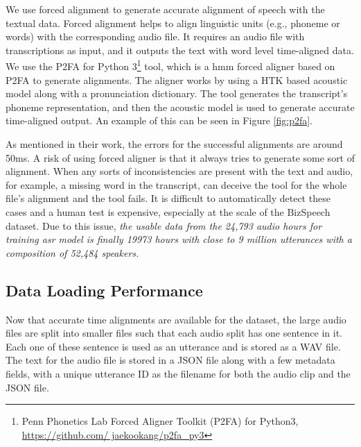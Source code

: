 We use forced alignment to generate accurate alignment of speech with the textual data. Forced alignment helps to align linguistic units (e.g., phoneme or words) with the corresponding audio file. It requires an audio file with transcriptions as input, and it outputs the text with word level time-aligned data. We use the P2FA for Python 3\footnote{Penn Phonetics Lab Forced Aligner Toolkit (P2FA) for Python3, \href{https://github.com/jaekookang/p2fa\_py3}{https://github.com/ jaekookang/p2fa\_py3}} tool, which is a \acrshort{hmm} forced aligner based on P2FA \cite{Yuan2008SPEAKERCORPUS} to generate alignments. The aligner works by using a HTK \cite{Young2002TheBook} based acoustic model along with a pronunciation dictionary. The tool generates the transcript's phoneme representation, and then the acoustic model is used to generate accurate time-aligned output. An example of this can be seen in Figure \ref{fig:p2fa}.

As mentioned in their work, the errors for the successful alignments are around 50ms. A risk of using forced aligner is that it always tries to generate some sort of alignment. When any sorts of inconsistencies are present with the text and audio, for example, a missing word in the transcript, can deceive the tool for the whole file's alignment and the tool fails. It is difficult to automatically detect these cases and a human test is expensive, especially at the scale of the BizSpeech dataset. Due to this issue, \emph{the usable data from the 24,793 audio hours for training \acrshort{asr} model is finally 19973 hours with close to 9 million utterances with a composition of 52,484 speakers.}

\subsection{Data Loading Performance}
Now that accurate time alignments are available for the dataset, the large audio files are split into smaller files such that each audio split has one sentence in it. Each one of these sentence is used as an utterance and is stored as a WAV file. The text for the audio file is stored in a JSON file along with a few metadata fields, with a unique utterance ID as the filename for both the audio clip and the JSON file. 


